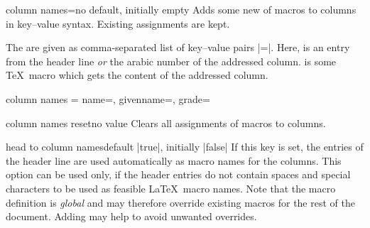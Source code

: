 \documentclass[a4paper,11pt]{ltxdoc}
\begin{document}
\begin{docCsvKey}{column names}{=}{no default, initially empty}
  Adds some new  of macros to columns in key–value syntax.
  Existing assignments are kept.\par
  The  are given as comma-separated list of key–value pairs
  \mbox{|=|}. Here,  is an entry from the
  header line \emph{or} the arabic number of the addressed column.
   is some \TeX\ macro which gets the content of the addressed column.
\begin{dispListing}
  column names = {name=\surname, givenname=\firstname, grade=\grade}
\end{dispListing}
\end{docCsvKey}


\begin{docCsvKey}{column names reset}{}{no value}
  Clears all assignments of macros to columns.
\end{docCsvKey}


\begin{docCsvKey}{head to column names}{}{default |true|, initially |false|}
  If this key is set, the entries of the header line are used automatically
  as macro names for the columns. This option can be used only, if
  the header entries do not contain spaces and special characters to be
  used as feasible \LaTeX\ macro names.
  Note that the macro definition is \emph{global} and may therefore override
  existing macros for the rest of the document. Adding
   may help to avoid unwanted
  overrides.
\end{docCsvKey}


\end{document}
